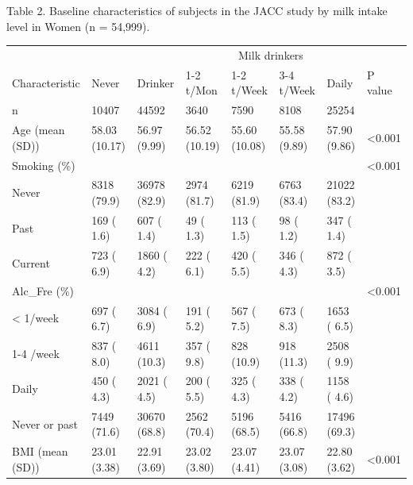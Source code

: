 \documentclass[]{tufte-handout}
\begin{document}
\begin{table}[!htbp]
Table 2. Baseline characteristics of subjects in the JACC study by milk intake level in Women (n = 54,999).

\centering
\fontsize{8}{10}\selectfont
\begin{tabular}[t]{llllllll}
\toprule
\multicolumn{1}{c}{ } & \multicolumn{1}{c}{} & \multicolumn{1}{c}{} & \multicolumn{4}{c}{Milk drinkers} & \multicolumn{1}{c}{} \\
\cmidrule(l{3pt}r{3pt}){4-7}
Characteristic & Never & Drinker & 1-2 t/Mon & 1-2 t/Week & 3-4 t/Week & Daily & P value\\
\midrule
\rowcolor{gray!6}  n & 10407 & 44592 & 3640 & 7590 & 8108 & 25254 & \\
Age (mean (SD)) & 58.03 (10.17) & 56.97 (9.99) & 56.52 (10.19) & 55.60 (10.08) & 55.58 (9.89) & 57.90 (9.86) & <0.001\\
\rowcolor{gray!6}  Smoking (\%) &  &  &  &  &  &  & <0.001\\
\hspace{1em}Never & 8318 (79.9) & 36978 (82.9) & 2974 (81.7) & 6219 (81.9) & 6763 (83.4) & 21022 (83.2) & \\
\rowcolor{gray!6}  \hspace{1em}Past & 169 ( 1.6) & 607 ( 1.4) & 49 ( 1.3) & 113 ( 1.5) & 98 ( 1.2) & 347 ( 1.4) & \\
\hspace{1em}Current & 723 ( 6.9) & 1860 ( 4.2) & 222 ( 6.1) & 420 ( 5.5) & 346 ( 4.3) & 872 ( 3.5) & \\
\rowcolor{gray!6}  Alc\_Fre (\%) &  &  &  &  &  &  & <0.001\\
\hspace{1em}< 1/week & 697 ( 6.7) & 3084 ( 6.9) & 191 ( 5.2) & 567 ( 7.5) & 673 ( 8.3) & 1653 ( 6.5) & \\
\rowcolor{gray!6}  \hspace{1em}1-4 /week & 837 ( 8.0) & 4611 (10.3) & 357 ( 9.8) & 828 (10.9) & 918 (11.3) & 2508 ( 9.9) & \\
\hspace{1em}Daily & 450 ( 4.3) & 2021 ( 4.5) & 200 ( 5.5) & 325 ( 4.3) & 338 ( 4.2) & 1158 ( 4.6) & \\
\rowcolor{gray!6}  \hspace{1em}Never or past & 7449 (71.6) & 30670 (68.8) & 2562 (70.4) & 5196 (68.5) & 5416 (66.8) & 17496 (69.3) & \\
BMI (mean (SD)) & 23.01 (3.38) & 22.91 (3.69) & 23.02 (3.80) & 23.07 (4.41) & 23.07 (3.08) & 22.80 (3.62) & <0.001\\

\end{tabular}
\end{table}
\end{document}
